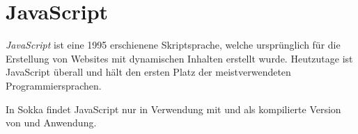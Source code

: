 \section{JavaScript}
\label{javascript}

\textit{JavaScript} ist eine 1995 erschienene Skriptsprache, welche ursprünglich für die Erstellung von Websites mit dynamischen Inhalten erstellt wurde. Heutzutage ist JavaScript überall und hält den ersten Platz der meistverwendeten Programmiersprachen. \cite{technostacks2021}

In Sokka findet JavaScript nur in Verwendung mit  und als kompilierte Version von  und  Anwendung.

